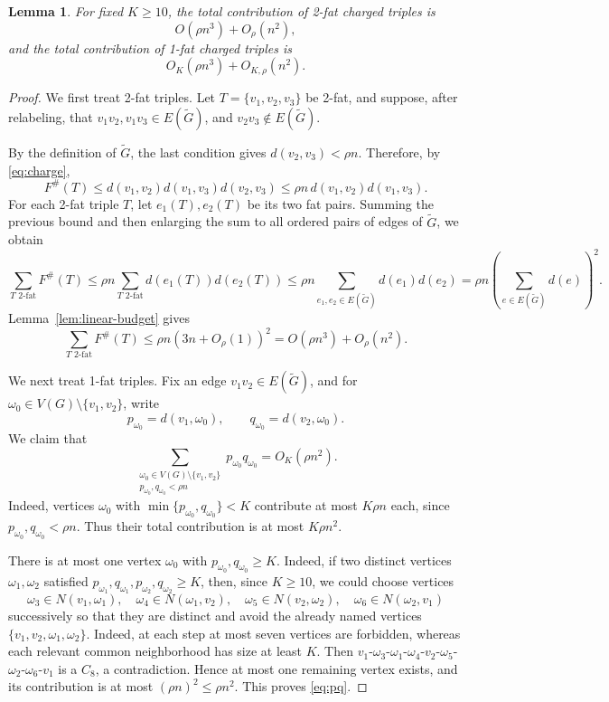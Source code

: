 \documentclass[10pt,a4paper]{amsart}
\newtheorem{lemma}{Lemma}
\begin{document}
\begin{lemma}\label{lem:one-two-fat}
For fixed \(K\ge10\), the total contribution of 2-fat charged triples is
\[
  O(\rho n^3)+O_\rho(n^2),
\]
and the total contribution of 1-fat charged triples is
\[
  O_K(\rho n^3)+O_{K,\rho}(n^2).
\]
\end{lemma}

\begin{proof}
We first treat 2-fat triples. Let \(T=\{v_1,v_2,v_3\}\) be 2-fat, and suppose, after relabeling, that
  \(v_1v_2,v_1v_3\in E(\tilde{G})\), and \(v_2v_3\notin E(\tilde{G})\).

By the definition of \(\tilde{G}\), the last condition gives \(d(v_2,v_3)<\rho n\). Therefore, by
\eqref{eq:charge},
\[
  F^{\#}(T)
  \le d(v_1,v_2)d(v_1,v_3)d(v_2,v_3)
  \le \rho n\,d(v_1,v_2)d(v_1,v_3).
\]
For each 2-fat triple \(T\), let \(e_1(T),e_2(T)\) be its two fat pairs. Summing the previous bound
and then enlarging the sum to all ordered pairs of edges of \(\tilde{G}\), we obtain
\[
  \sum_{T\text{ 2-fat}}F^{\#}(T)
  \le \rho n\sum_{T\text{ 2-fat}}d(e_1(T))d(e_2(T))
  \le \rho n\sum_{e_1,e_2\in E(\tilde{G})}d(e_1)d(e_2)
  =\rho n\left(\sum_{e\in E(\tilde{G})}d(e)\right)^2.
\]
Lemma~\ref{lem:linear-budget} gives
\[
  \sum_{T\text{ 2-fat}}F^{\#}(T)
  \le \rho n(3n+O_\rho(1))^2
  =O(\rho n^3)+O_\rho(n^2).
\]


We next treat 1-fat triples. Fix an edge \(v_1v_2\in E(\tilde{G})\), and for
\(\omega_0\in V(G)\setminus\{v_1,v_2\}\), write
\[
  p_{\omega_0}=d(v_1,\omega_0),\qquad q_{\omega_0}=d(v_2,\omega_0).
\]
We claim that
\begin{equation}\label{eq:pq}
  \sum_{\substack{\omega_0\in V(G)\setminus\{v_1,v_2\}\\p_{\omega_0},q_{\omega_0}<\rho n}}
  p_{\omega_0}q_{\omega_0}
  =O_K(\rho n^2).
\end{equation}
Indeed, vertices \(\omega_0\) with \(\min\{p_{\omega_0},q_{\omega_0}\}<K\) contribute at most \(K\rho n\)
each, since \(p_{\omega_0},q_{\omega_0}<\rho n\). Thus their total contribution is at most
\(K\rho n^2\).

There is at most one vertex \(\omega_0\) with \(p_{\omega_0},q_{\omega_0}\ge K\). Indeed, if two
distinct vertices \(\omega_1,\omega_2\) satisfied
$p_{\omega_1},q_{\omega_1},p_{\omega_2},q_{\omega_2}\ge K$,
then, since \(K\ge10\), we could choose vertices
\[
  \omega_3\in N(v_1,\omega_1),\quad
  \omega_4\in N(\omega_1,v_2),\quad
  \omega_5\in N(v_2,\omega_2),\quad
  \omega_6\in N(\omega_2,v_1)
\]
successively so that they are distinct and avoid the already named vertices
\(\{v_1,v_2,\omega_1,\omega_2\}\). Indeed, at each step at most seven vertices are forbidden,
whereas each relevant common neighborhood has size at least \(K\).
Then
  $v_1$-$\omega_3$-$\omega_1$-$\omega_4$-$v_2$-$\omega_5$-$\omega_2$-$\omega_6$-$v_1$
is a \(C_8\), a contradiction. Hence at most one remaining vertex exists, and its contribution is at
most \((\rho n)^2\le\rho n^2\). This proves \eqref{eq:pq}.


\end{proof}
\end{document}
